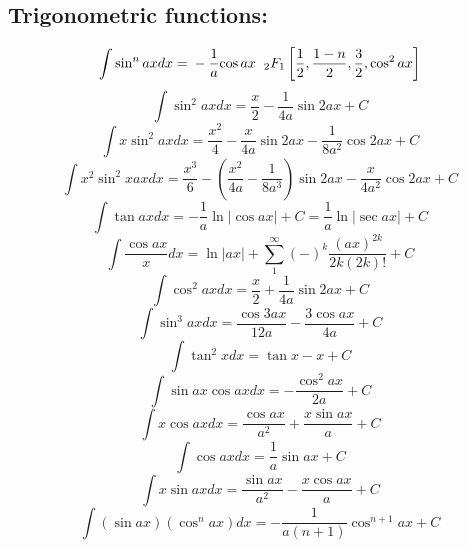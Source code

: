\documentclass[12pt,a4paper]{article}
\begin{document}
	\subsection*{Trigonometric functions:}
	\begin{equation}
		\int \sin^n ax dx =
		\nonumber \\ 
		-\frac{1}{a}{\cos ax} \hspace{2mm}{_2F_1}\left[
		\frac{1}{2}, \frac{1-n}{2}, \frac{3}{2}, \cos^2 ax
		\right]
	\end{equation}
	\begin{equation}
		\int \sin ^2 ax dx = \frac{x}{2} - \frac{1}{4a} \sin 2ax + C
	\end{equation}
	\begin{equation}
		\int x \sin ^2 ax dx = \frac{x^2}{4} - \frac{x}{4a} \sin 2ax - \frac{1}{8a^2} \cos 2ax + C
	\end{equation}
	\begin{equation}
		\int x^2 \sin^2 x ax dx = \frac{x^3}{6} - (\frac{x^2}{4a} - \frac{1}{8a^3})\sin 2ax - \frac{x}{4a^2} \cos 2ax +C
	\end{equation}
	\begin{equation}
		\int \tan ax dx = - \frac{1}{a} \ln |\cos ax| + C = \frac{1}{a} \ln |\sec ax | +C
	\end{equation}
	\begin{equation}
		\int \frac{\cos ax}{x} dx = \ln |ax| + \sum_{1}^{\infty} (-)^k \frac{(ax)^{2k}}{2k (2k)!} +C
	\end{equation}
	\begin{equation}
		\int \cos ^2 ax dx = \frac{x}{2} + \frac{1}{4a} \sin 2ax + C
	\end{equation}
	\begin{equation}
		\int \sin^3 ax dx = \frac{\cos 3ax}{12a} - \frac{3 \cos ax}{4a} + C
	\end{equation}
	\begin{equation}
		\int \tan^2 x dx = \tan x -x +C
	\end{equation}
	\begin{equation}
		\int \sin ax \cos ax dx = - \frac{\cos^2 ax}{2a} + C
	\end{equation}
	\begin{equation}
		\int x \cos ax dx = \frac{\cos ax}{a^2} + \frac{x \sin ax}{a} + C
	\end{equation}
	\begin{equation}
		\int \cos ax dx = \frac{1}{a} \sin ax + C
	\end{equation}
	\begin{equation}
		\int x \sin ax dx = \frac{\sin ax }{a^2} -\frac{x \cos ax }{a} + C
	\end{equation}
	\begin{equation}
		\int (\sin ax) (\cos^n ax) dx = - \frac{1}{a ( n + 1)} \cos ^{n+1} ax + C
	\end{equation}
	
\end{document}
